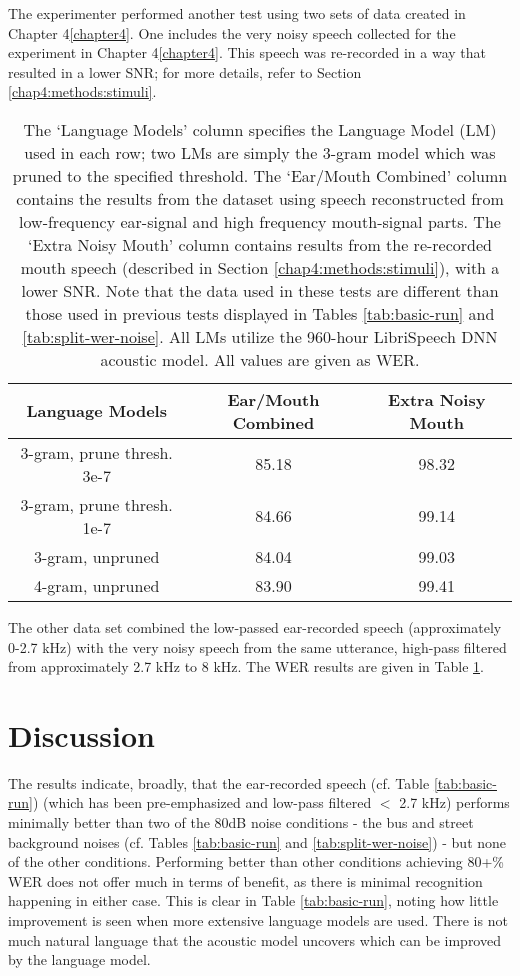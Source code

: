 \documentclass[dissertation,copyright]{uathesis}
\begin{document}
The experimenter performed another test using two sets of data created in Chapter 4\ref{chapter4}.  One includes the very noisy speech collected for the experiment in Chapter 4\ref{chapter4}.  This speech was re-recorded in a way that resulted in a lower SNR; for more details, refer to Section \ref{chap4:methods:stimuli}.    


\begin{table}[h]
\begin{center}
\begin{tabular}{| c || c | c |} \hline
Language Models & Ear/Mouth Combined & Extra Noisy Mouth \\ \hline\hline
3-gram, prune thresh. 3e-7 & 85.18 & 98.32 \\ \hline
3-gram, prune thresh. 1e-7 & 84.66 & 99.14 \\ \hline
3-gram, unpruned & 84.04 & 99.03 \\ \hline
4-gram, unpruned & 83.90 & 99.41 \\ \hline
\end{tabular}
\end{center}
\caption{The `Language Models' column specifies the Language Model (LM) used in each row; two LMs are simply the 3-gram model which was pruned to the specified threshold.  The `Ear/Mouth Combined' column contains the results from the dataset using speech reconstructed from low-frequency ear-signal and high frequency mouth-signal parts.  The `Extra Noisy Mouth' column contains results from the re-recorded mouth speech (described in Section \ref{chap4:methods:stimuli}), with a lower SNR.  Note that the data used in these tests are different than those used in previous tests displayed in Tables \ref{tab:basic-run} and \ref{tab:split-wer-noise}. All LMs utilize the 960-hour LibriSpeech DNN acoustic model.  All values are given as WER.}\label{tab:follow-up-asr}
\end{table}

The other data set combined the low-passed ear-recorded speech (approximately 0-2.7 kHz) with the very noisy speech from the same utterance, high-pass filtered from approximately 2.7 kHz to 8 kHz.  The WER results are given in Table \ref{tab:follow-up-asr}.


\section{Discussion}

The results indicate, broadly, that the ear-recorded speech (cf. Table \ref{tab:basic-run}) (which has been pre-emphasized and low-pass filtered $<$ 2.7 kHz) performs minimally better than two of the 80dB noise conditions - the bus and street background noises (cf. Tables \ref{tab:basic-run} and \ref{tab:split-wer-noise}) - but none of the other conditions.  Performing better than other conditions achieving 80+\% WER does not offer much in terms of benefit, as there is minimal recognition happening in either case.  This is clear in Table \ref{tab:basic-run}, noting how little improvement is seen when more extensive language models are used.  There is not much natural language that the acoustic model uncovers which can be improved by the language model.
\end{document}

